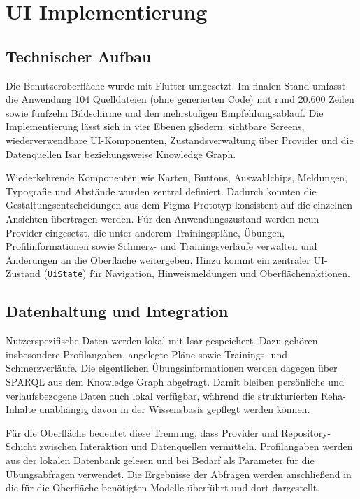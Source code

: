 \section{UI Implementierung}

\subsection{Technischer Aufbau}

Die Benutzeroberfläche wurde mit Flutter umgesetzt. Im finalen Stand umfasst die Anwendung 104 Quelldateien (ohne generierten Code) mit rund 20.600 Zeilen sowie fünfzehn Bildschirme und den mehrstufigen Empfehlungsablauf. Die Implementierung lässt sich in vier Ebenen gliedern: sichtbare Screens, wiederverwendbare UI-Komponenten, Zustandsverwaltung über Provider und die Datenquellen Isar beziehungsweise Knowledge Graph.

Wiederkehrende Komponenten wie Karten, Buttons, Auswahlchips, Meldungen, Typografie und Abstände wurden zentral definiert. Dadurch konnten die Gestaltungsentscheidungen aus dem Figma-Prototyp konsistent auf die einzelnen Ansichten übertragen werden. Für den Anwendungszustand werden neun Provider eingesetzt, die unter anderem Trainingspläne, Übungen, Profilinformationen sowie Schmerz- und Trainingsverläufe verwalten und Änderungen an die Oberfläche weitergeben. Hinzu kommt ein zentraler UI-Zustand (\texttt{UiState}) für Navigation, Hinweismeldungen und Oberflächenaktionen.

\subsection{Datenhaltung und Integration}

Nutzerspezifische Daten werden lokal mit Isar gespeichert. Dazu gehören insbesondere Profilangaben, angelegte Pläne sowie Trainings- und Schmerzverläufe. Die eigentlichen Übungsinformationen werden dagegen über SPARQL aus dem Knowledge Graph abgefragt. Damit bleiben persönliche und verlaufsbezogene Daten auch lokal verfügbar, während die strukturierten Reha-Inhalte unabhängig davon in der Wissensbasis gepflegt werden können.

Für die Oberfläche bedeutet diese Trennung, dass Provider und Repository-Schicht zwischen Interaktion und Datenquellen vermitteln. Profilangaben werden aus der lokalen Datenbank gelesen und bei Bedarf als Parameter für die Übungsabfragen verwendet. Die Ergebnisse der Abfragen werden anschließend in die für die Oberfläche benötigten Modelle überführt und dort dargestellt.

